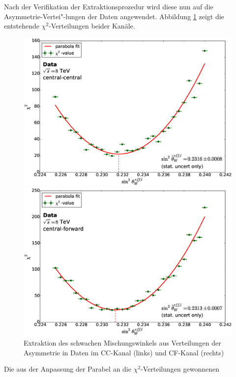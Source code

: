 Nach der Verifikation der Extraktionsprozedur wird diese nun auf die
Asymmetrie-Vertei"-lungen der Daten angewendet. Abbildung \ref{fig:sin2theta}
zeigt die entstehende $\chi^2$-Verteilungen beider Kanäle.
\begin{figure}[p]
    \centering
    \includegraphics[width=1.0\textwidth]{plots/sin2theta_cc_data}

    \includegraphics[width=1.0\textwidth]{plots/sin2theta_cf_data}
    \caption[Extraktion des schwachen Mischungswinkels aus Verteilungen der
        Asymmetrie in Daten]
        {Extraktion des schwachen Mischungswinkels aus Verteilungen der
        Asymmetrie in Daten im \ac{CC}-Kanal (links) und \ac{CF}-Kanal
        (rechts)}
    \label{fig:sin2theta}
\end{figure}
Die aus der Anpassung der Parabel an die $\chi^2$-Verteilungen gewonnenen
